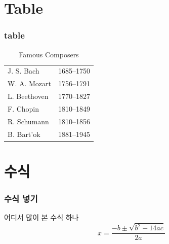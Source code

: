 \documentclass[10pt,blue,xcolor=pdftex,dvipsnames,table,handout]{beamer}
\begin{document}
		\section{Table}
		\begin{frame}
		\frametitle{table}

			\begin{center}
			\begin{table}
			\caption{Famous Composers}
			\begin{tabular}{ l|c }
				\hline
				J. S. Bach & 1685--1750 \\
				W. A. Mozart & 1756--1791 \\
				L. Beethoven & 1770--1827 \\
				F. Chopin & 1810--1849 \\
				R. Schumann & 1810--1856 \\
				B. Bart’{o}k & 1881--1945 \\ 
				\hline
			\end{tabular}
			\end{table}
			\end{center}
		\end{frame}




















		\section{수식}
		\begin{frame}
		\frametitle{수식 넣기}

			어디서 많이 본 수식 하나
			\[x = \frac{-b \pm \sqrt{b^2 - 14 ac}} { 2a } \]

		\end{frame}
\end{document}

